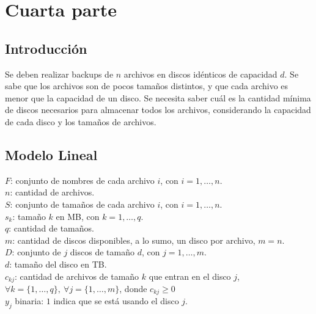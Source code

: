 \documentclass[11pt, a4paper, pdftex]{article}
\begin{document}
\section{Cuarta parte}

\subsection{Introducción}

Se deben realizar backups de $n$ archivos en discos idénticos de
capacidad $d$.  Se sabe que los archivos son de pocos tamaños distintos,
y que cada archivo es menor que la capacidad de un disco. Se necesita
saber cuál es la cantidad mínima de discos necesarios para almacenar
todos los archivos, considerando la capacidad de cada disco y los
tamaños de archivos.

\subsection{Modelo Lineal}

$F$: conjunto de nombres de cada archivo $i$, con $i = 1, \ldots, n$. \\

$n$: cantidad de archivos. \\

$S$: conjunto de tamaños de cada archivo $i$, con $i = 1, \ldots, n$. \\

$s_{k}$: tamaño $k$ en MB, con $k = 1, \ldots, q$. \\

$q$: cantidad de tamaños. \\

$m$: cantidad de discos disponibles, a lo sumo, un disco por archivo, $m = n$. \\

$D$: conjunto de $j$ discos de tamaño $d$, con $j = 1, \ldots, m$. \\

$d$: tamaño del disco en TB. \\ 

$c_{kj}$: cantidad de archivos de tamaño $k$ que entran en el disco $j$, $\forall k = \{1, \ldots, q\},\ \forall j = \{1, \ldots, m\}$, donde $c_{kj} \ge 0$\\

$y_{j}$ binaria: $1$ indica que se está usando el disco $j$.
\end{document}
